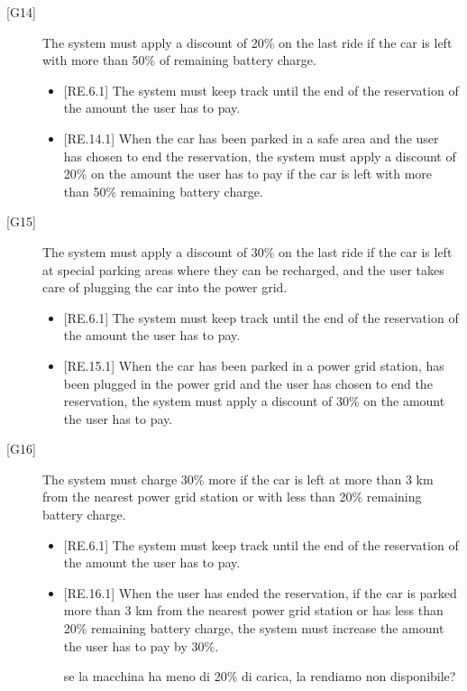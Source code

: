 \documentclass[english]{article}
\begin{document}
\begin{description}
\item[{[G14]}]{The system must apply a discount of 20\% on the last ride if the car is left with more than 50\% of remaining battery charge.
\begin{itemize}
	\item{[RE.6.1] The system must keep track until the end of the reservation of the amount the user has to pay.}
	\item{[RE.14.1] When the car has been parked in a safe area and the user has chosen to end the reservation, the system must apply a discount of 20\% on the amount the user has to pay if the car is left with more than 50\% remaining battery charge.}
\end{itemize}
}

\item[{[G15]}]{The system must apply a discount of 30\% on the last ride if the car is left at special parking areas where they can be recharged, and the user takes care of plugging the car into the power grid.
\begin{itemize}
	\item{[RE.6.1] The system must keep track until the end of the reservation of the amount the user has to pay.}
	\item{[RE.15.1] When the car has been parked in a power grid station, has been plugged in the power grid and the user has chosen to end the reservation, the system must apply a discount of 30\% on the amount the user has to pay.}
\end{itemize}
}

\item[{[G16]}]{The system must charge 30\% more if the car is left at more than 3 km from the nearest power grid station or with less than 20\% remaining battery charge.
\begin{itemize}
	\item{[RE.6.1] The system must keep track until the end of the reservation of the amount the user has to pay.}
	\item{[RE.16.1] When the user has ended the reservation, if the car is parked more than 3 km from the nearest power grid station or has less than 20\% remaining battery charge, the system must increase the amount the user has to pay by 30\%.}
	
se la macchina ha meno di 20\% di carica, la rendiamo non disponibile?
\end{itemize}
}

\end{description}
\end{document}
